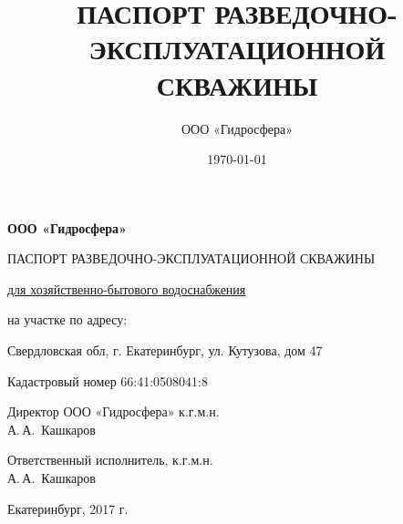 \documentclass[a4paper,12pt]{article} %
\author{ООО «Гидросфера»}\label{company}
\title{ПАСПОРТ РАЗВЕДОЧНО-ЭКСПЛУАТАЦИОННОЙ СКВАЖИНЫ}
\date{\today}
\begin{document}
\begin{titlepage}
	\begin{center}
		\textbf{ООО «Гидросфера»}
		\vspace{2.5cm}
		
		{\LARGE ПАСПОРТ РАЗВЕДОЧНО-ЭКСПЛУАТАЦИОННОЙ СКВАЖИНЫ}
		\vspace{0.25cm}
		
		\underline{для хозяйственно-бытового водоснабжения}
		
		\bigskip
		
		на участке по адресу: 
		
		Свердловская обл, г. Екатеринбург, ул. Кутузова, дом 47

		Кадастровый номер 66:41:0508041:8
		
		\vfill
	
		\bigskip
		
	\end{center}

	\vfill
	
	\newlength{\ML}
	\hfill\begin{minipage}{0.4\textwidth}
		Директор ООО «Гидросфера» к.г.м.н.
		\\
		\underline{\hspace{\ML}} А.\,А.~Кашкаров\\
	\end{minipage}%
	\bigskip
	
	\hfill\begin{minipage}{0.4\textwidth}
		Ответственный исполнитель, к.г.м.н.
		\\
		\underline{\hspace{\ML}} А.\,А.~Кашкаров\\
	\end{minipage}%
	\vfill
	
	\begin{center}
		Екатеринбург, 2017 г.
	\end{center}
\end{titlepage}


	\maketitle
	
\end{document}
